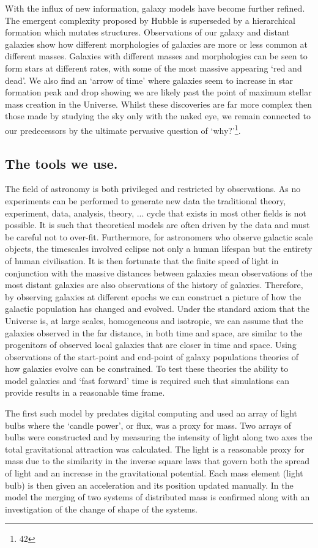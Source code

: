 With the influx of new information, galaxy models have become further refined. The emergent complexity proposed by Hubble is superseded by a hierarchical formation which mutates structures. Observations of our galaxy and distant galaxies show how different morphologies of galaxies are more or less common at different masses. Galaxies with different masses and morphologies can be seen to form stars at different rates, with some of the most massive appearing `red and dead'. We also find an `arrow of time' where galaxies seem to increase in star formation peak and drop showing we are likely past the point of maximum stellar mass creation in the Universe. Whilst these discoveries are far more complex then those made by studying the sky only with the naked eye, we remain connected to our predecessors by the ultimate pervasive question of `why?'\footnote{42}.

\subsection{The tools we use.}
The field of astronomy is both privileged and restricted by observations. As no experiments can be performed to generate new data the traditional theory, experiment, data, analysis, theory, ... cycle that exists in most other fields is not possible. It is such that theoretical models are often driven by the data and must be careful not to over-fit. Furthermore, for astronomers who observe galactic scale objects, the timescales involved eclipse not only a human lifespan but the entirety of human civilisation. It is then fortunate that the finite speed of light in conjunction with the massive distances between galaxies mean observations of the most distant galaxies are also observations of the history of galaxies. Therefore, by observing galaxies at different epochs we can construct a picture of how the galactic population has changed and evolved. Under the standard axiom that the Universe is, at large scales, homogeneous and isotropic, we can assume that the galaxies observed in the far distance, in both time and space, are similar to the progenitors of observed local galaxies that are closer in time and space. Using observations of the start-point and end-point of galaxy populations theories of how galaxies evolve can be constrained. To test these theories the ability to model galaxies and `fast forward' time is required such that simulations can provide results in a reasonable time frame.

The first such model by \citet{Holmberg1941OnProcedure.} predates digital computing and used an array of light bulbs where the `candle power', or flux, was a proxy for mass. Two arrays of bulbs were constructed and by measuring the intensity of light along two axes the total gravitational attraction was calculated. The light is a reasonable proxy for mass due to the similarity in the inverse square laws that govern both the spread of light and an increase in the gravitational potential. Each mass element (light bulb) is then given an acceleration and its position updated manually. In the \citet{Holmberg1941OnProcedure.} model the merging of two systems of distributed mass is confirmed along with an investigation of the change of shape of the systems. 

